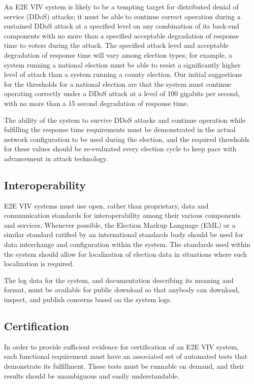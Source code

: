 An E2E VIV system is likely to be a tempting target for distributed
denial of service (DDoS) attacks; it must be able to continue correct
operation during a sustained DDoS attack at a specified level on any
combination of its back-end components with no more than a specified
acceptable degradation of response time to voters during the
attack. The specified attack level and acceptable degradation of
response time will vary among election types; for example, a system
running a national election must be able to resist a significantly
higher level of attack than a system running a county election. Our
initial suggestions for the thresholds for a national election are
that the system must continue operating correctly under a DDoS attack
at a level of 100 gigabits per second, with no more than a 15 second
degradation of response time.

The ability of the system to survive DDoS attacks and continue
operation while fulfilling the response time requirements must be
demonstrated in the actual network configuration to be used during the
election, and the required thresholds for these values should be
re-evaluated every election cycle to keep pace with advancement in
attack technology.

\subsection{Interoperability}

E2E VIV systems must use open, rather than proprietary, data and
communication standards for interoperability among their various
components and services. Whenever possible, the Election Markup
Language (EML) or a similar standard ratified by an international
standards body should be used for data interchange and configuration
within the system. The standards used within the system should allow
for localization of election data in situations where such
localization is required.

The log data for the system, and documentation describing its meaning
and format, must be available for public download so that anybody can
download, inspect, and publish concerns based on the system logs. 

\subsection{Certification}

In order to provide sufficient evidence for certification of an E2E
VIV system, each functional requirement must have an associated set of
automated tests that demonstrate its fulfillment. These tests must be
runnable on demand, and their results should be unambiguous and easily
understandable.

